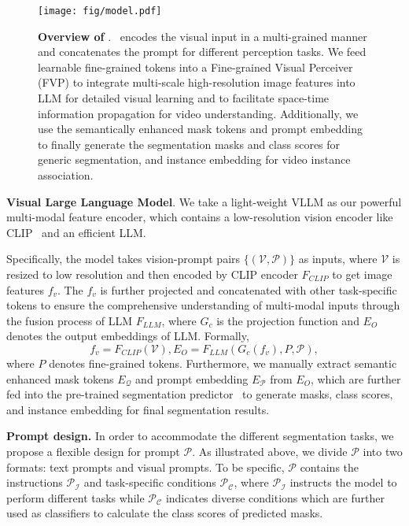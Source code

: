 \begin{figure*}[t]
    \centering
    \texttt{[image: fig/model.pdf]}
    \caption{\textbf{Overview of \name}. \name~encodes the visual input in a multi-grained manner and concatenates the prompt for different perception tasks. We feed learnable fine-grained tokens into a Fine-grained Visual Perceiver (FVP) to integrate multi-scale high-resolution image features into LLM for detailed visual learning and to facilitate space-time information propagation for video understanding.
    Additionally, we use the semantically enhanced mask tokens and prompt embedding to finally generate the segmentation masks and class scores for generic segmentation, and instance embedding for video instance association.}
    \label{fig:model}
    \vspace{-3mm}
\end{figure*}

\noindent \textbf{Visual Large Language Model}. 
We take a light-weight VLLM as our powerful multi-modal feature encoder, which contains a low-resolution vision encoder like CLIP~\cite{radford2021learning} and an efficient LLM.

Specifically, the model takes vision-prompt pairs $\{(\mathcal{V},\mathcal{P})\}$ as inputs, where $\mathcal{V}$ is resized to low resolution and then encoded by CLIP encoder $F_{CLIP}$ to get image features $f_{v}$. The $f_{v}$ is further projected and concatenated with other task-specific tokens to ensure the comprehensive understanding of multi-modal inputs through the fusion process of LLM $F_{LLM}$, where $G_{c}$ is the projection function and $E_{O}$ denotes the output embeddings of LLM. Formally,
\begin{equation}
     f_{v}=F_{CLIP}(\mathcal{V}), E_{O}=F_{LLM}(G_{c}(f_{v}), P, \mathcal{P}),
\label{Eq: PSALM}
\end{equation}
where $P$ denotes fine-grained tokens.
Furthermore, we manually extract semantic enhanced
mask tokens $E_\mathcal{Q}$ and prompt embedding $E_{\mathcal{P}}$
from $E_{O}$, which are further fed into the pre-trained segmentation predictor~\cite{cheng2022masked} to generate masks, class scores, and instance embedding for final segmentation results.

\noindent \textbf{Prompt design.} 
In order to accommodate the different segmentation tasks, we propose a flexible design for prompt $\mathcal{P}$. 
As illustrated above, we divide $\mathcal{P}$ into two formats: text prompts and visual prompts. 
To be specific, $\mathcal{P}$ contains the instructions $\mathcal{P_I}$ and task-specific conditions $\mathcal{P_C}$, where $\mathcal{P_I}$ instructs the model to perform different tasks while 
$\mathcal{P_C}$ indicates diverse conditions which are further used as classifiers to calculate the class scores of predicted masks.

